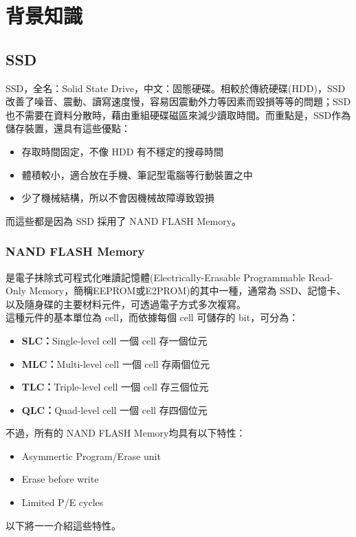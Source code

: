 \chapter{背景知識}

\section{SSD}\label{s2.1}
\indent
SSD，全名：Solid State Drive，中文：固態硬碟。相較於傳統硬碟(HDD)，SSD改善了噪音、震動、讀寫速度慢，容易因震動外力等因素而毀損等等的問題；SSD 也不需要在資料分散時，藉由重組硬碟磁區來減少讀取時間。而重點是，SSD作為儲存裝置，還具有這些優點：\cite{SSD}
\begin{itemize}
    \item 存取時間固定，不像 HDD 有不穩定的搜尋時間
    \item 體積較小，適合放在手機、筆記型電腦等行動裝置之中
    \item 少了機械結構，所以不會因機械故障導致毀損
\end{itemize}

而這些都是因為 SSD 採用了 NAND FLASH Memory。

\subsection{NAND FLASH Memory}\label{s2.1.1}
\indent
是電子抹除式可程式化唯讀記憶體(Electrically-Erasable Programmable Read-Only Memory，簡稱EEPROM或E2PROM)的其中一種，通常為 SSD、記憶卡、以及隨身碟的主要材料元件，可透過電子方式多次複寫。\\
這種元件的基本單位為 cell，而依據每個 cell 可儲存的 bit，可分為：
\begin{itemize}
    \item \textbf{SLC：}Single-level cell   一個 cell 存一個位元
    \item \textbf{MLC：}Multi-level cell    一個 cell 存兩個位元
    \item \textbf{TLC：}Triple-level cell   一個 cell 存三個位元
    \item \textbf{QLC：}Quad-level cell     一個 cell 存四個位元
\end{itemize}
不過，所有的 NAND FLASH Memory均具有以下特性：
\begin{itemize}
    \item Asymmertic Program/Erase unit
    \item Erase before write
    \item Limited P/E cycles
\end{itemize}
以下將一一介紹這些特性。

